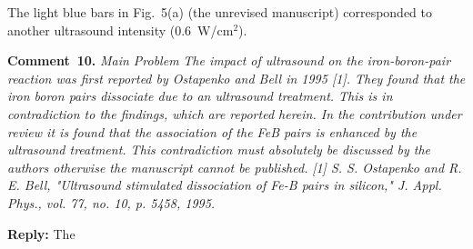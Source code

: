 \documentclass[aip,jap,preprint]{revtex4-1}
\begin{document}
The light blue bars in Fig.~5(a) (the unrevised manuscript) corresponded to another ultrasound intensity
(0.6~W/cm$^2$).

\vspace{1cm}
\noindent
\textcolor[rgb]{0.00,0.50,1.00}{\textbf{Comment~10.}}
\emph{Main Problem}
\emph{The impact of ultrasound on the iron-boron-pair reaction was first reported by Ostapenko and Bell in 1995 [1]. They found that the iron boron pairs dissociate due to an ultrasound treatment. This is in contradiction to the findings, which are reported herein. In the contribution under review it is found that the association of the FeB pairs is enhanced by the ultrasound treatment. This contradiction must absolutely be discussed by the authors otherwise the manuscript cannot be published.}
\emph{
[1] S. S. Ostapenko and R. E. Bell, "Ultrasound stimulated dissociation of Fe-B pairs in silicon," J. Appl. Phys., vol. 77, no. 10, p. 5458, 1995.
 }

\noindent
\textcolor[rgb]{0.51,0.00,0.00}{\textbf{Reply:}}
The



\end{document}
